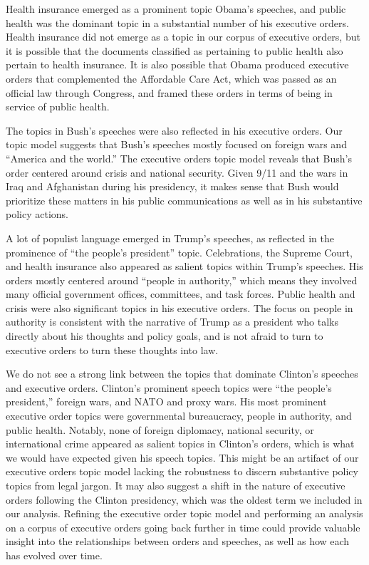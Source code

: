 \documentclass{article}
\begin{document}
{{Health insurance emerged as a prominent topic Obama’s speeches, and public health was the dominant topic in a substantial number of his executive orders. Health insurance did not emerge as a topic in our corpus of executive orders, but it is possible that the documents classified as pertaining to public health also pertain to health insurance. It is also possible that Obama produced executive orders that complemented the Affordable Care Act, which was passed as an official law through Congress, and framed these orders in terms of being in service of public health.

The topics in Bush’s speeches were also reflected in his executive orders. Our topic model suggests that Bush’s speeches mostly focused on foreign wars and “America and the world.” The executive orders topic model reveals that Bush’s order centered around crisis and national security. Given 9/11 and the wars in Iraq and Afghanistan during his presidency, it makes sense that Bush would prioritize these matters in his public communications as well as in his substantive policy actions.

A lot of populist language emerged in Trump’s speeches, as reflected in the prominence of “the people’s president” topic. Celebrations, the Supreme Court, and health insurance also appeared as salient topics within Trump’s speeches. His orders mostly centered around “people in authority,” which means they involved many official government offices, committees, and task forces. Public health and crisis were also significant topics in his executive orders. The focus on people in authority is consistent with the narrative of Trump as a president who talks directly about his thoughts and policy goals, and is not afraid to turn to executive orders to turn these thoughts into law. 

We do not see a strong link between the topics that dominate Clinton’s speeches and executive orders. Clinton’s prominent speech topics were “the people’s president,” foreign wars, and NATO and proxy wars. His most prominent executive order topics were governmental bureaucracy, people in authority, and public health. Notably, none of foreign diplomacy, national security, or international crime appeared as salient topics in Clinton’s orders, which is what we would have expected given his speech topics. This might be an artifact of our executive orders topic model lacking the robustness to discern substantive policy topics from legal jargon. It may also suggest a shift in the nature of executive orders following the Clinton presidency, which was the oldest term we included in our analysis. Refining the executive order topic model and performing an analysis on a corpus of executive orders going back further in time could provide valuable insight into the relationships between orders and speeches, as well as how each has evolved over time. 
}


}
\end{document}
